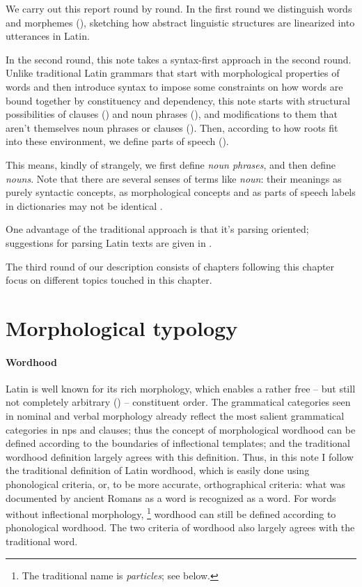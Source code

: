 \documentclass[a4paper, oneside, 12pt]{report}
\newcommand*{\term}[1]{\emph{#1}}
\begin{document}
We carry out this report round by round.
In the first round we distinguish words and morphemes
(),
sketching how abstract linguistic structures are linearized into utterances in Latin.

In the second round, this note takes a syntax-first approach in the second round.
Unlike traditional Latin grammars that start with morphological properties of words
and then introduce syntax to impose some constraints on how words are bound together
by constituency and dependency,
this note starts with structural possibilities of clauses ()
and noun phrases (),
and modifications to them that aren't themselves noun phrases or clauses 
().
Then, according to how roots fit into these environment,
we define parts of speech (). 

This means, kindly of strangely, we first define \term{noun phrases},
and then define \term{nouns}.
Note that there are several senses of terms like \term{noun}:
their meanings as purely syntactic concepts, as morphological concepts
and as parts of speech labels in dictionaries
may not be identical
.

One advantage of the traditional approach is that it's parsing oriented;
suggestions for parsing Latin texts are given in .

The third round of our description
consists of chapters following this chapter focus on different topics touched in this chapter.

\section{Morphological typology}\label{sec:grammatical.word}

\paragraph*{Wordhood}

Latin is well known for its rich morphology,
which enables a rather free -- but still not completely arbitrary ()
-- constituent order.
The grammatical categories seen in nominal and verbal morphology 
already reflect the most salient grammatical categories
in \acs{np}s and clauses;
thus the concept of morphological wordhood can be defined according to 
the boundaries of inflectional templates;
and the traditional wordhood definition largely agrees with this definition. 
Thus, in this note I follow the traditional definition of Latin wordhood,
which is easily done using phonological criteria,
or, to be more accurate, orthographical criteria: 
what was documented by ancient Romans as a word 
is recognized as a word.
For words without inflectional morphology,%
\footnote{
    The traditional name is \term{particles};
    see below.
} 
wordhood can still be defined according to phonological wordhood.
The two criteria of wordhood also largely agrees with the traditional word.
\end{document}
